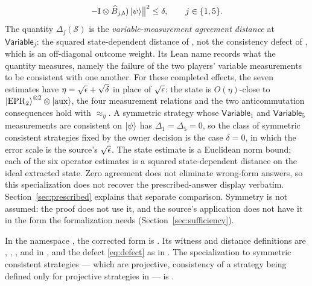 \documentclass[11pt]{article}
\newcommand{\strategy}{\mathcal{S}}
\newcommand{\EPR}{\mathrm{EPR}}
\newcommand{\aux}{\mathrm{aux}}
\newcommand{\Id}{\mathrm{I}}
\newcommand{\Variable}{\mathsf{Variable}}
\begin{document}
\begin{enumerate}
\begin{equation}
      - \Id \ot \widehat B_{j,b}) \ket{\psi} \bigr\|^2 \le \delta,
    \qquad j \in \{1, 5\}.
    \label{eq:defect}
  \end{equation}
  The quantity $\Delta_j(\strategy)$ is the \emph{variable-measurement
  agreement distance} at $\Variable_j$: the squared state-dependent distance
  of , not the consistency defect of
  , which is an off-diagonal outcome weight.  Its Lean
  name  records what the
  quantity measures, namely the failure of the two players' variable
  measurements to be consistent with one another.
  For these completed effects, the seven estimates have
  $\eta = \sqrt{\epsilon} + \sqrt\delta$ in place of $\sqrt{\epsilon}$: the state is
  $O(\eta)$-close to $\ket{\EPR_2}^{\ot 2} \ot \ket{\aux}$, the four
  measurement relations and the two anticommutation consequences hold with
  $\approx_\eta$.  A symmetric strategy whose $\Variable_1$ and $\Variable_5$
  measurements are consistent on $\ket{\psi}$ has $\Delta_1 = \Delta_5 = 0$,
  so the class of symmetric consistent strategies fixed by the owner decision
  is the case $\delta = 0$, in which the error scale is the source's
  $\sqrt{\epsilon}$. The state estimate is a Euclidean norm bound; each of the six
  operator estimates is a squared state-dependent distance on the ideal
  extracted state. Zero agreement does not eliminate wrong-form answers, so
  this specialization does not recover the prescribed-answer display verbatim.
  Section~\ref{sec:prescribed} explains that separate comparison.
  Symmetry is not assumed: the proof does not use it, and the
  source's application does not have it in the form the formalization needs
  (Section~\ref{sec:sufficiency}).
\end{enumerate}
In the namespace , the corrected form is
. Its witness and distance definitions are
, ,
, and  in
, and the defect
\eqref{eq:defect} as  in
.
The specialization to symmetric consistent strategies --- which are
projective, consistency of a strategy being defined only for projective
strategies in  --- is
.
\end{document}
